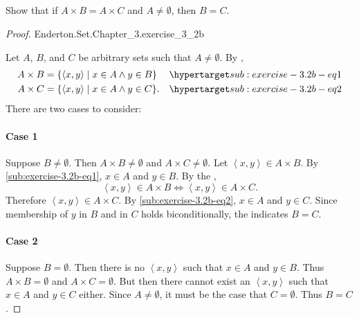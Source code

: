 \documentclass{report}
\newcommand{\pair}[1]{\left< #1 \right>}
\begin{document}
\subsection{}%

Show that if $A \times B = A \times C$ and $A \neq \emptyset$, then $B = C$.

\begin{proof}

    {Enderton.Set.Chapter\_3.exercise\_3\_2b}

  Let $A$, $B$, and $C$ be arbitrary sets such that $A \neq \emptyset$.
  By ,
    \begin{align}
      A \times B & = \{ \pair{x, y} \mid x \in A \land y \in B \}
        & \hyperlabel{sub:exercise-3.2b-eq1} \\
      A \times C & = \{ \pair{x, y} \mid x \in A \land y \in C \}.
        & \hyperlabel{sub:exercise-3.2b-eq2}
    \end{align}
  There are two cases to consider:

  \paragraph{Case 1}%

    Suppose $B \neq \emptyset$.
    Then $A \times B \neq \emptyset$ and $A \times C \neq \emptyset$.
    Let $\pair{x, y} \in A \times B$.
    By \eqref{sub:exercise-3.2b-eq1}, $x \in A$ and $y \in B$.
    By the ,
      $$\pair{x, y} \in A \times B \iff \pair{x, y} \in A \times C.$$
    Therefore $\pair{x, y} \in A \times C$.
    By \eqref{sub:exercise-3.2b-eq2}, $x \in A$ and $y \in C$.
    Since membership of $y$ in $B$ and in $C$ holds biconditionally, the
       indicates $B = C$.

  \paragraph{Case 2}%

    Suppose $B = \emptyset$.
    Then there is no $\pair{x, y}$ such that $x \in A$ and $y \in B$.
    Thus $A \times B = \emptyset$ and $A \times C = \emptyset$.
    But then there cannot exist an $\pair{x, y}$ such that $x \in A$
      and $y \in C$ either.
    Since $A \neq \emptyset$, it must be the case that $C = \emptyset$.
    Thus $B = C$.

\end{proof}
\end{document}
